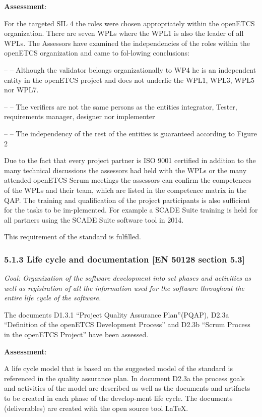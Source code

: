 \bigskip

\textbf{Assessment}:

For the targeted SIL 4 the roles were chosen appropriately within the openETCS organization. There are seven WPLs where the WPL1 is also the leader of all WPLs. The Assessors have examined the independencies of the roles within the openETCS organization and came to fol-lowing conclusions:

{}-- –	Although the validator belongs organizationally to WP4 he is an independent entity in the openETCS project and does not underlie the WPL1, WPL3, WPL5 nor WPL7.

{}-- –	The verifiers are not the same persons as the entities integrator, Tester, requirements manager, designer nor implementer

{}-- –	The independency of the rest of the entities is guaranteed according to Figure 2 


Due to the fact that every project partner is ISO 9001 certified in addition to the many technical discussions the assessors had held with the WPLs or the many attended openETCS Scrum meetings the assessors can confirm the competences of the WPLs and their team, which are listed in the competence matrix in the QAP.
The training and qualification of the project participants is also sufficient for the tasks to be im-plemented. For example a SCADE Suite training is held for all partners using the SCADE Suite software tool in 2014.

This requirement of the standard is fulfilled.


\subsubsection{5.1.3 Life cycle and documentation [EN 50128 section 5.3]}
\textit{Goal: Organization of the software development into set phases and activities as well as registration of all the information used for the software throughout the entire life cycle of the software.}
\bigskip

The documents D1.3.1 ``Project Quality Assurance Plan''(PQAP), D2.3a ``Definition of the openETCS Development Process'' and D2.3b ``Scrum Process in the openETCS Project'' have been assessed.

\textbf{Assessment}:
\bigskip

A life cycle model that is based on the suggested model of the standard is referenced in the quality assurance plan. In document D2.3a the process goals and activities of the model are described as well as the documents and artifacts to be created in each phase of the develop-ment life cycle. The documents (deliverables) are created with the open source tool LaTeX.

